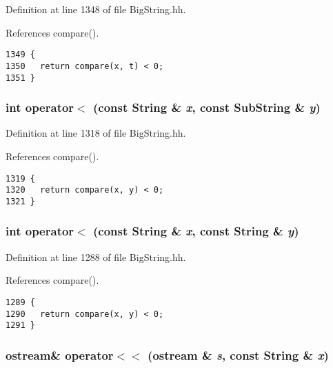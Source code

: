 Definition at line 1348 of file Big\-String.hh.

References compare().



\footnotesize\begin{verbatim}1349 {
1350   return compare(x, t) < 0; 
1351 }
\end{verbatim}\normalsize 
{}
\subsubsection{\setlength{\rightskip}{0pt plus 5cm}int operator$<$ (const {\bf String} \& {\em x}, const {\bf Sub\-String} \& {\em y})\hspace{0.3cm}{\tt  [inline]}}\label{BigString_8hh_a96}




Definition at line 1318 of file Big\-String.hh.

References compare().



\footnotesize\begin{verbatim}1319 {
1320   return compare(x, y) < 0; 
1321 }
\end{verbatim}\normalsize 
{}
\subsubsection{\setlength{\rightskip}{0pt plus 5cm}int operator$<$ (const {\bf String} \& {\em x}, const {\bf String} \& {\em y})\hspace{0.3cm}{\tt  [inline]}}\label{BigString_8hh_a90}




Definition at line 1288 of file Big\-String.hh.

References compare().



\footnotesize\begin{verbatim}1289 {
1290   return compare(x, y) < 0; 
1291 }
\end{verbatim}\normalsize 
{}
\subsubsection{\setlength{\rightskip}{0pt plus 5cm}ostream\& operator$<$$<$ (ostream \& {\em s}, const {\bf String} \& {\em x})\hspace{0.3cm}{\tt  [inline]}}\label{BigString_8hh_a85}




